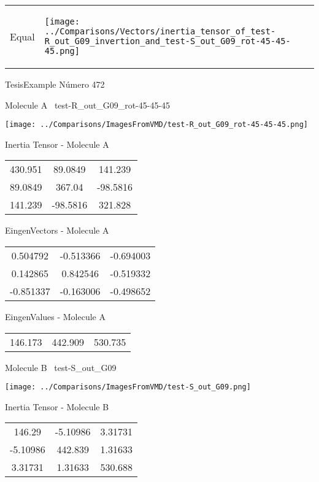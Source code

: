 \vtab[-5mm]
\begin{tabular}{*{2}{m{}}}
\begin{center}
\textcolor{NavyBlue}{\Large Equal}
\end{center}
&
\begin{center}
\texttt{[image: ../Comparisons/Vectors/inertia\_tensor\_of\_test-R\_out\_G09\_invertion\_and\_test-S\_out\_G09\_rot-45-45-45.png]}
\end{center}
\end{tabular}

 \newpage

\vtab[-3cm]
\begin{center}
{\large TesisExample \tab Número 472}
\end{center}
\begin{multicols}{2}
\begin{center}

Molecule A \
test-R\_out\_G09\_rot-45-45-45

\texttt{[image: ../Comparisons/ImagesFromVMD/test-R\_out\_G09\_rot-45-45-45.png]}

Inertia Tensor - Molecule A \\
\begin{tabular}{|c c c|}
430.951	 & 	89.0849	 & 	141.239	 \\
89.0849	 & 	367.04	 & 	-98.5816	 \\
141.239	 & 	-98.5816	 & 	321.828
\end{tabular}

\vtab
 EingenVectors - Molecule A     \\
\begin{tabular}{|c c c|}
0.504792	 & 	-0.513366	 & 	-0.694003	 \\
0.142865	 & 	0.842546	 & 	-0.519332	 \\
-0.851337	 & 	-0.163006	 & 	-0.498652
\end{tabular}

\vtab
 EingenValues - Molecule A     \\
\begin{tabular}{|c c c|}
146.173	 & 	442.909	 & 	530.735	 \\
\end{tabular}
\columnbreak

Molecule B \
test-S\_out\_G09

\texttt{[image: ../Comparisons/ImagesFromVMD/test-S\_out\_G09.png]}

Inertia Tensor - Molecule B \\
\begin{tabular}{|c c c|}
146.29	 & 	-5.10986	 & 	3.31731	 \\
-5.10986	 & 	442.839	 & 	1.31633	 \\
3.31731	 & 	1.31633	 & 	530.688
\end{tabular}


\end{center}
\end{multicols}
